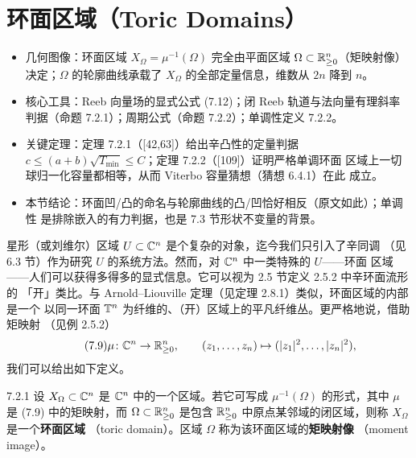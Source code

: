 
\section{环面区域（Toric Domains）}

\begin{keytakeaways}
\begin{itemize}
  \item 几何图像：环面区域 $X_\Omega=\mu^{-1}(\Omega)$ 完全由平面区域
        $\Omega\subset\mathbb{R}^n_{\ge0}$（矩映射像）决定；$\Omega$ 的轮廓曲线承载了
        $X_\Omega$ 的全部定量信息，维数从 $2n$ 降到 $n$。
  \item 核心工具：Reeb 向量场的显式公式 (7.12)；闭 Reeb 轨道与法向量有理斜率
        判据（命题 7.2.1）；周期公式（命题 7.2.2）；单调性定义 7.2.2。
  \item 关键定理：定理 7.2.1（[42,63]）给出辛凸性的定量判据
        $c\le(a+b)\sqrt{T_{\min}}\le C$；定理 7.2.2（[109]）证明严格单调环面
        区域上一切球归一化容量都相等，从而 Viterbo 容量猜想（猜想 6.4.1）在此
        成立。
  \item 本节结论：环面凹/凸的命名与轮廓曲线的凸/凹恰好相反（原文如此）；单调性
        是排除嵌入的有力判据，也是 7.3 节形状不变量的背景。
\end{itemize}
\end{keytakeaways}

星形（或刘维尔）区域 $U\subset\mathbb{C}^n$ 是个复杂的对象，迄今我们只引入了辛同调
（见 6.3 节）作为研究 $U$ 的系统方法。然而，对 $\mathbb{C}^n$ 中一类特殊的 $U$——环面
区域——人们可以获得多得多的显式信息。它可以视为 2.5 节定义 2.5.2 中辛环面流形的
「开」类比。与 Arnold--Liouville 定理（见定理 2.8.1）类似，环面区域的内部是一个
以同一环面 $\mathbb{T}^n$ 为纤维的、（开）区域上的平凡纤维丛。更严格地说，借助矩映射
（见例 2.5.2）
\begin{equation}\tag{7.9}
  \mu\colon\mathbb{C}^n\to\mathbb{R}^n_{\ge0},\qquad
  (z_1,\dots,z_n)\mapsto(|z_1|^2,\dots,|z_n|^2),
\end{equation}
我们可以给出如下定义。

\begin{wdefn}{7.2.1}
  设 $X_\Omega\subset\mathbb{C}^n$ 是 $\mathbb{C}^n$ 中的一个区域。若它可写成 $\mu^{-1}(\Omega)$
  的形式，其中 $\mu$ 是 (7.9) 中的矩映射，而 $\Omega\subset\mathbb{R}^n_{\ge0}$ 是包含
  $\mathbb{R}^n_{\ge0}$ 中原点某邻域的闭区域，则称 $X_\Omega$ 是一个\textbf{环面区域}
  （toric domain）。区域 $\Omega$ 称为该环面区域的\textbf{矩映射像}
  （moment image）。
\end{wdefn}

